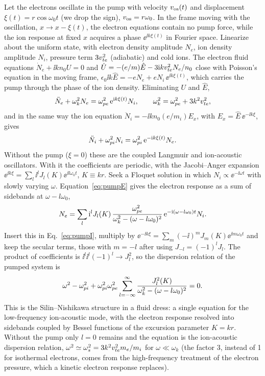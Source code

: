 Let the electrons oscillate in the pump with velocity $v_{\rm os}(t)$ and displacement $\xi(t)=r\cos\omega_0t$ (we drop the sign), $v_{\rm os}=r\omega_0$. In the frame moving with the oscillation, $x\to x-\xi(t)$, the electron equations contain no pump force, while the ion response at fixed $x$ acquires a phase $\ee^{\ii k\xi(t)}$ in Fourier space. Linearize about the uniform state, with electron density amplitude $N_e$, ion density amplitude $N_i$, pressure term $3v_{te}^2$ (adiabatic) and cold ions. The electron fluid equations $\dot N_e+\ii kn_0U=0$ and $\dot U=-(e/m)\hat E-3\mathrm{i} kv_{te}^2N_e/n_0$ close with Poisson's equation in the moving frame, $\epsilon_0\ii k\hat E=-eN_e+eN_i\,\ee^{\ii k\xi(t)}$, which carries the pump through the phase of the ion density. Eliminating $U$ and $\hat E$,
\begin{equation}
\ddot N_e+\omega_k^2N_e=\omega_{pe}^2\,\mathrm{e}^{\mathrm{i} k\xi(t)}N_i ,\qquad \omega_k^2=\omega_{pe}^2+3k^2v_{te}^2 ,\label{eq:pumpE}
\end{equation}
and in the same way the ion equation $\ddot N_i=-\ii kn_0(e/m_i)E_x$, with $E_x=\hat E\,\ee^{-\ii k\xi}$, gives
\begin{equation}
\ddot N_i+\omega_{pi}^2N_i=\omega_{pi}^2\,\mathrm{e}^{-\mathrm{i} k\xi(t)}N_e .\label{eq:pumpI}
\end{equation}
Without the pump ($\xi=0$) these are the coupled Langmuir and ion-acoustic oscillators. With it the coefficients are periodic, with the Jacobi--Anger expansion $\ee^{\ii k\xi}=\sum_l\ii^lJ_l(K)\ee^{\ii l\omega_0t}$, $K\equiv kr$. Seek a Floquet solution in which $N_i\propto\ee^{-\ii\omega t}$ with slowly varying $\omega$. Equation~\eqref{eq:pumpE} gives the electron response as a sum of sidebands at $\omega-l\omega_0$,
\begin{equation}
N_e=\sum_l\mathrm{i}^lJ_l(K)\,\frac{\omega_{pe}^2}{\omega_k^2-(\omega-l\omega_0)^2}\,\mathrm{e}^{-\mathrm{i}(\omega-l\omega_0)t}N_i .
\end{equation}
Insert this in Eq.~\eqref{eq:pumpI}, multiply by $\ee^{-\ii k\xi}=\sum_m(-\ii)^mJ_m(K)\ee^{\ii m\omega_0t}$ and keep the secular terms, those with $m=-l$ after using $J_{-l}=(-1)^lJ_l$. The product of coefficients is $\ii^l\ii^{l}(-1)^l\to J_l^2$, so the dispersion relation of the pumped system is
\begin{equation}
\omega^2-\omega_{pi}^2+\omega_{pi}^2\omega_{pe}^2\sum_{l=-\infty}^{\infty}\frac{J_l^2(K)}{\omega_k^2-(\omega-l\omega_0)^2}=0 .\label{eq:floquet}
\end{equation}
This is the Silin--Nishikawa structure in a fluid dress: a single equation for the low-frequency ion-acoustic mode, with the electron response resolved into sidebands coupled by Bessel functions of the excursion parameter $K=kr$. Without the pump only $l=0$ remains and the equation is the ion-acoustic dispersion relation, $\omega^2\simeq\omega_s^2=3k^2v_{te}^2m_e/m_i$ for $\omega\ll\omega_k$ (the factor 3, instead of 1 for isothermal electrons, comes from the high-frequency treatment of the electron pressure, which a kinetic electron response replaces).

